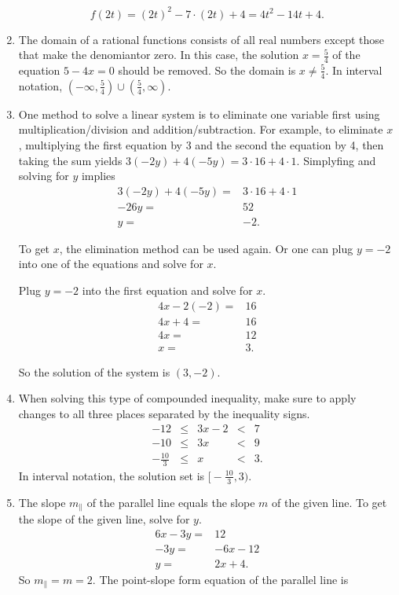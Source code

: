 \documentclass[
  12pt]{article}
\begin{document}
\begin{enumerate}
  \[f(2t)=(2t)^2-7\cdot (2t) + 4=4t^2-14t+4.\]
\item
  The domain of a rational functions consists of all real numbers except
  those that make the denomiantor zero. In this case, the solution
  \(x=\frac54\) of the equation \(5-4x=0\) should be removed. So the
  domain is \(x\neq\frac54\). In interval notation,
  \((-\infty, \frac54)\cup(\frac54,\infty)\).
\item
  One method to solve a linear system is to eliminate one variable first
  using multiplication/division and addition/subtraction. For example,
  to eliminate \(x\), multiplying the first equation by 3 and the second
  the equation by 4, then taking the sum yields
  \(3(-2y)+4(-5y)=3\cdot 16+4\cdot 1\). Simplyfing and solving for \(y\)
  implies \[
  \begin{aligned}
  3(-2y)+4(-5y)=&3\cdot 16+4\cdot 1\\
  -26y=&52\\
  y=&-2.
  \end{aligned}
  \]

  To get \(x\), the elimination method can be used again. Or one can
  plug \(y=-2\) into one of the equations and solve for \(x\).

  Plug \(y=-2\) into the first equation and solve for \(x\). \[
  \begin{aligned}
  4x-2(-2)=&16\\
  4x+4=&16\\
  4x=&12\\
  x=&3.
  \end{aligned}
  \]

  So the solution of the system is \((3, -2)\).
\item
  When solving this type of compounded inequality, make sure to apply
  changes to all three places separated by the inequality signs. \[
  \begin{array}{rcccl}
  -12 &\le& 3x-2 &<&7\\
  -10 &\le& 3x &<&9\\
  -\frac{10}{3}&\le& x &<&3.
  \end{array}
  \] In interval notation, the solution set is
  \(\big[-\frac{10}{3}, 3\big)\).
\item
  The slope \(m_{\parallel}\) of the parallel line equals the slope
  \(m\) of the given line. To get the slope of the given line, solve for
  \(y\). \[
  \begin{aligned}
  6x-3y=&12\\
  -3y=&-6x-12\\
  y=&2x+4.
  \end{aligned}
  \] So \(m_\parallel=m=2\). The point-slope form equation of the
  parallel line is


\end{enumerate}
\end{document}
